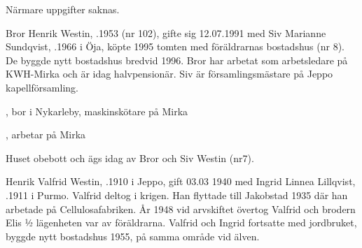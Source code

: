 Närmare uppgifter saknas.\jhvspace{}






Bror Henrik Westin, .1953 (nr 102), gifte sig 12.07.1991 med Siv Marianne Sundqvist, .1966 i Öja, köpte 1995 tomten med föräldrarnas bostadshus (nr 8). De byggde nytt bostadshus bredvid 1996. Bror har arbetat som arbetsledare på KWH-Mirka och är idag halvpensionär. Siv är församlingsmästare på Jeppo kapellförsamling.
\begin{jhchildren}
  \item {}, bor i Nykarleby, maskinskötare på Mirka
  \item {}, arbetar på Mirka
\end{jhchildren}




Huset obebott och ägs idag av Bror och Siv Westin (nr7).\jhvspace{}



Henrik Valfrid Westin, .1910 i Jeppo, gift 03.03 1940 med Ingrid Linnea Lillqvist, .1911 i Purmo. Valfrid deltog i krigen. Han flyttade till Jakobstad 1935 där han arbetade på Cellulosafabriken. År 1948 vid arvskiftet övertog Valfrid och brodern Elis ½ lägenheten var av föräldrarna. Valfrid och Ingrid fortsatte med jordbruket, byggde nytt bostadshus 1955, på samma område vid älven.


